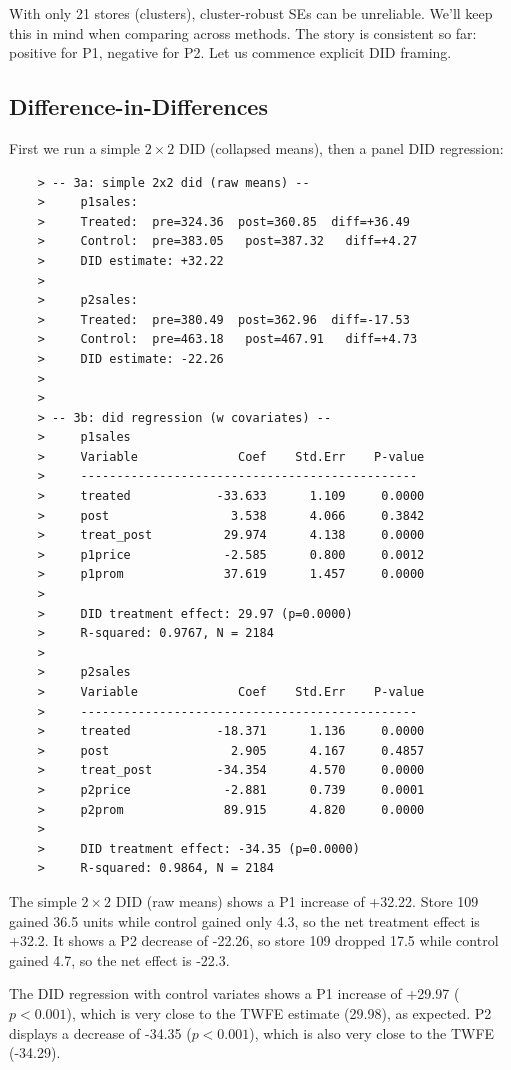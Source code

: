 \documentclass[10pt]{article}
\begin{document}
With only 21 stores (clusters), cluster-robust SEs can be unreliable. We'll keep this in mind when comparing across methods. The story is consistent so far: positive for P1, negative for P2. Let us commence explicit DID framing. 
\newpage
\subsection{Difference-in-Differences}
First we run a simple $2\times 2 $ DID (collapsed means), then a panel DID regression:
\begin{verbatim}
    > -- 3a: simple 2x2 did (raw means) --
    >     p1sales:
    >     Treated:  pre=324.36  post=360.85  diff=+36.49
    >     Control:  pre=383.05   post=387.32   diff=+4.27
    >     DID estimate: +32.22
    > 
    >     p2sales:
    >     Treated:  pre=380.49  post=362.96  diff=-17.53
    >     Control:  pre=463.18   post=467.91   diff=+4.73
    >     DID estimate: -22.26
    > 
    > 
    > -- 3b: did regression (w covariates) --
    >     p1sales
    >     Variable              Coef    Std.Err    P-value
    >     -----------------------------------------------
    >     treated            -33.633      1.109     0.0000
    >     post                 3.538      4.066     0.3842
    >     treat_post          29.974      4.138     0.0000
    >     p1price             -2.585      0.800     0.0012
    >     p1prom              37.619      1.457     0.0000
    > 
    >     DID treatment effect: 29.97 (p=0.0000)
    >     R-squared: 0.9767, N = 2184
    > 
    >     p2sales
    >     Variable              Coef    Std.Err    P-value
    >     -----------------------------------------------
    >     treated            -18.371      1.136     0.0000
    >     post                 2.905      4.167     0.4857
    >     treat_post         -34.354      4.570     0.0000
    >     p2price             -2.881      0.739     0.0001
    >     p2prom              89.915      4.820     0.0000
    > 
    >     DID treatment effect: -34.35 (p=0.0000)
    >     R-squared: 0.9864, N = 2184
\end{verbatim}

The simple $2\times 2 $ DID (raw means) shows a P1 increase of +32.22. Store 109 gained 36.5 units while control gained only 4.3, so the net treatment effect is +32.2. It shows a P2 decrease of -22.26, so store 109 dropped 17.5 while control gained 4.7, so the net effect is -22.3. 

The DID regression with control variates shows a P1 increase of +29.97 ($p<0.001 $), which is very close to the TWFE estimate (29.98), as expected. P2 displays a decrease of -34.35 ($p<0.001 $), which is also very close to the TWFE (-34.29). 
\end{document}
